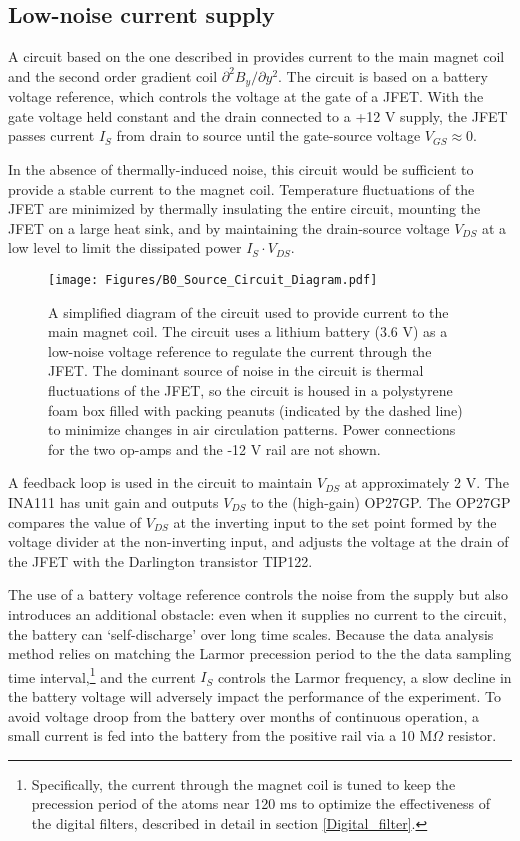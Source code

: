 \documentclass [10pt, twoside] {uwthesis}[2012/04/02]
\begin{document}
\subsection{Low-noise current supply}
A circuit based on the one described in \cite{1997_Italian_low-noise_current_source} provides current to the main magnet coil and the second order gradient coil $\partial^2 B_y/\partial y^2$. The circuit is based on a battery voltage reference, which controls the voltage at the gate of a JFET. With the gate voltage held constant and the drain connected to a +12 V supply, the JFET passes current $I_S$ from drain to source until the gate-source voltage $V_{GS} \approx 0$. 

In the absence of thermally-induced noise, this circuit would be sufficient to provide a stable current to the magnet coil. Temperature fluctuations of the JFET are minimized by thermally insulating the entire circuit, mounting the JFET on a large heat sink, and by maintaining the drain-source voltage $V_{DS}$ at a low level to limit the dissipated power $I_S \cdot V_{DS}$. 
\begin{figure}
\begin{center}
\texttt{[image: Figures/B0\_Source\_Circuit\_Diagram.pdf]}
\end{center}
\caption[$\mathbf{B}_0$ current source diagram]{\narrower A simplified diagram of the circuit used to provide current to the main magnet coil. The circuit uses a lithium battery (3.6 V) as a low-noise voltage reference to regulate the current through the JFET. The dominant source of noise in the circuit is thermal fluctuations of the JFET, so the circuit is housed in a polystyrene foam box filled with packing peanuts (indicated by the dashed line) to minimize changes in air circulation patterns. Power connections for the two op-amps and the -12 V rail are not shown.}
\label{Italian_Source_Diagram}
\end{figure}
A feedback loop is used in the circuit to maintain $V_{DS}$ at approximately 2 V. The INA111 has unit gain and outputs $V_{DS}$ to the (high-gain) OP27GP. The OP27GP compares the value of $V_{DS}$ at the inverting input to the set point formed by the voltage divider at the non-inverting input, and adjusts the voltage at the drain of the JFET with the Darlington transistor TIP122. 

The use of a battery voltage reference controls the noise from the supply but also introduces an additional obstacle: even when it supplies no current to the circuit, the battery can `self-discharge' over long time scales. Because the data analysis method relies on matching the Larmor precession period to the the data sampling time interval,\footnote{Specifically, the current through the magnet coil is tuned to keep the precession period of the atoms near 120 ms to optimize the effectiveness of the digital filters, described in detail in section \ref{Digital_filter}.} and the current $I_S$ controls the Larmor frequency, a slow decline in the battery voltage will adversely impact the performance of the experiment. To avoid voltage droop from the battery over months of continuous operation, a small current is fed into the battery from the positive rail via a 10 M$\Omega$ resistor.
\end{document}
